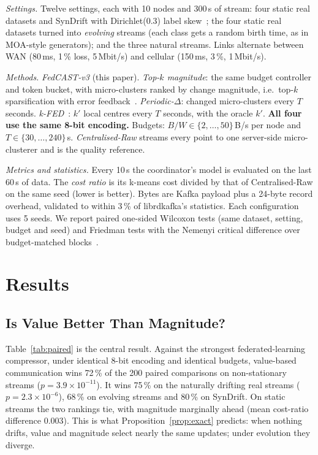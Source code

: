 \documentclass[journal]{IEEEtran}
\begin{document}
\textit{Settings.} Twelve settings, each with 10 nodes and 300\,s of stream: four static real datasets and SynDrift with Dirichlet(0.3) label skew~\cite{hsu2019noniid}; the four static real datasets turned into \emph{evolving} streams (each class gets a random birth time, as in MOA-style generators); and the three natural streams. Links alternate between WAN (80\,ms, 1\,\% loss, 5\,Mbit/s) and cellular (150\,ms, 3\,\%, 1\,Mbit/s).

\textit{Methods.} \emph{FedCAST-v3} (this paper). \emph{Top-$k$ magnitude}: the same budget controller and token bucket, with micro-clusters ranked by change magnitude, i.e.\ top-$k$ sparsification with error feedback~\cite{aji2017sparse,stich2018sparsified}. \emph{Periodic-$\Delta$}: changed micro-clusters every $T$ seconds. \emph{k-FED}~\cite{dennis2021kfed}: $k'$ local centres every $T$ seconds, with the oracle $k'$. \textbf{All four use the same 8-bit encoding.} Budgets: $B/W\in\{2,\dots,50\}$\,B/s per node and $T\in\{30,\dots,240\}$\,s. \emph{Centralised-Raw} streams every point to one server-side micro-clusterer and is the quality reference.

\textit{Metrics and statistics.} Every 10\,s the coordinator's model is evaluated on the last 60\,s of data. The \emph{cost ratio} is its k-means cost divided by that of Centralised-Raw on the same seed (lower is better). Bytes are Kafka payload plus a 24-byte record overhead, validated to within 3\,\% of librdkafka's statistics. Each configuration uses 5 seeds. We report paired one-sided Wilcoxon tests (same dataset, setting, budget and seed) and Friedman tests with the Nemenyi critical difference over budget-matched blocks~\cite{demsar2006statistical}.

\section{Results}\label{sec:results}

\subsection{Is Value Better Than Magnitude?}\label{sec:value}
Table~\ref{tab:paired} is the central result. Against the strongest federated-learning compressor, under identical 8-bit encoding and identical budgets, value-based communication wins 72\,\% of the 200 paired comparisons on non-stationary streams ($p=3.9\times10^{-11}$). It wins 75\,\% on the naturally drifting real streams ($p=2.3\times10^{-6}$), 68\,\% on evolving streams and 80\,\% on SynDrift. On static streams the two rankings tie, with magnitude marginally ahead (mean cost-ratio difference 0.003). This is what Proposition~\ref{prop:exact} predicts: when nothing drifts, value and magnitude select nearly the same updates; under evolution they diverge.
\end{document}
